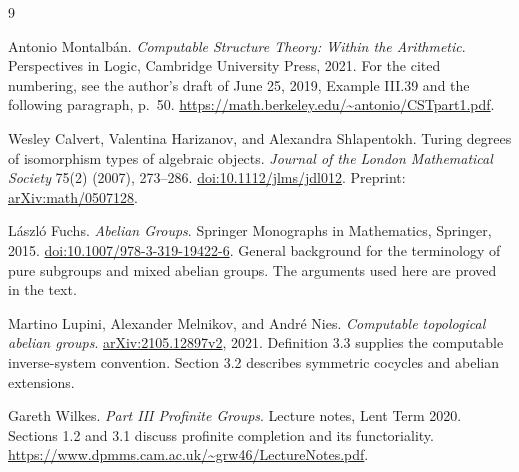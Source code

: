\begin{thebibliography}{9}
Antonio Montalb\'an.
\emph{Computable Structure Theory: Within the Arithmetic}.
Perspectives in Logic, Cambridge University Press, 2021.
For the cited numbering, see the author's draft of June 25, 2019, Example III.39 and the following paragraph, p.~50.
\url{https://math.berkeley.edu/~antonio/CSTpart1.pdf}.

Wesley Calvert, Valentina Harizanov, and Alexandra Shlapentokh.
Turing degrees of isomorphism types of algebraic objects.
\emph{Journal of the London Mathematical Society} 75(2) (2007), 273--286.
\href{https://doi.org/10.1112/jlms/jdl012}{doi:10.1112/jlms/jdl012}.
Preprint: \href{https://arxiv.org/abs/math/0507128}{arXiv:math/0507128}.

L\'aszl\'o Fuchs.
\emph{Abelian Groups}.
Springer Monographs in Mathematics, Springer, 2015.
\href{https://doi.org/10.1007/978-3-319-19422-6}{doi:10.1007/978-3-319-19422-6}.
General background for the terminology of pure subgroups and mixed abelian groups. The arguments used here are proved in the text.

Martino Lupini, Alexander Melnikov, and Andr\'e Nies.
\emph{Computable topological abelian groups}.
\href{https://arxiv.org/abs/2105.12897v2}{arXiv:2105.12897v2}, 2021.
Definition 3.3 supplies the computable inverse-system convention. Section 3.2 describes symmetric cocycles and abelian extensions.

Gareth Wilkes.
\emph{Part III Profinite Groups}.
Lecture notes, Lent Term 2020.
Sections 1.2 and 3.1 discuss profinite completion and its functoriality.
\url{https://www.dpmms.cam.ac.uk/~grw46/LectureNotes.pdf}.
\end{thebibliography}
